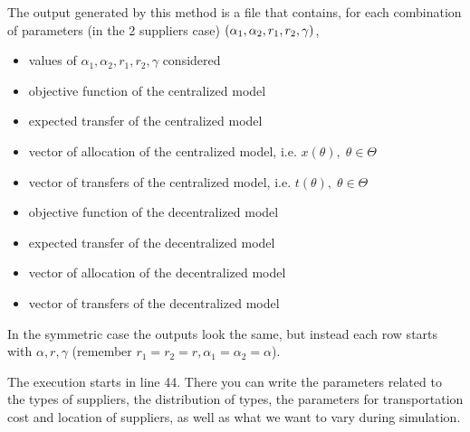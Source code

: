 \documentclass[11pt, oneside]{article}
\begin{document}
The output generated by this method is a file that contains, for each combination of parameters (in the 2 suppliers case)
\(\left(\alpha_1, \alpha_2, r_1, r_2, \gamma\right)\),
\begin{itemize}
  \item values of \(\alpha_1, \alpha_2, r_1, r_2, \gamma\) considered
  \item objective function of the centralized model
  \item expected transfer of the centralized model
  \item vector of allocation of the centralized model, i.e. \(x(\theta), \; \theta \in \Theta\)
  \item vector of transfers of the centralized model, i.e. \(t(\theta), \; \theta \in \Theta\)
  \item objective function of the decentralized model
  \item expected transfer of the decentralized model
  \item vector of allocation of the decentralized model
  \item vector of transfers of the decentralized model
\end{itemize}

In the symmetric case the outputs look the same, but instead each row starts with
\(\alpha, r, \gamma\) (remember \(r_1=r_2=r, \alpha_1=\alpha_2=\alpha\)).

The execution starts in line 44. There you can write the parameters related to the
types of suppliers, the distribution of types, the parameters for transportation
cost and location of suppliers, as well as what we want to vary during simulation.
\end{document}
